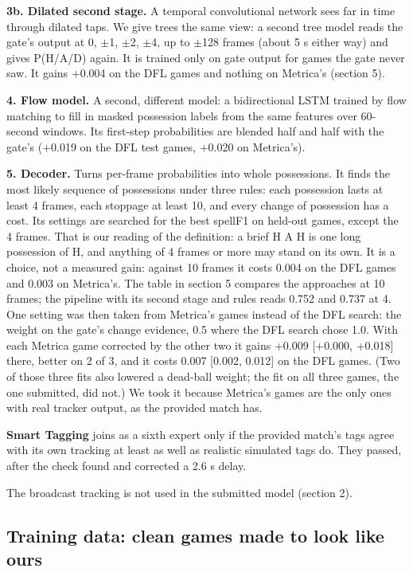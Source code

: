 \documentclass[10pt,a4paper]{article}
\begin{document}
\textbf{3b. Dilated second stage.} A temporal convolutional network sees far in time through dilated
taps. We give trees the same view: a second tree model reads the gate's output at 0, \ensuremath{\pm}1, \ensuremath{\pm}2, \ensuremath{\pm}4,
up to \ensuremath{\pm}128 frames (about 5 s either way) and gives P(H/A/D) again. It is trained only on gate
output for games the gate never saw. It gains +0.004 on the DFL games and nothing on Metrica's
(section 5).


\textbf{4. Flow model.} A second, different model: a bidirectional LSTM trained by flow matching to
fill in masked possession labels from the same features over 60-second windows. Its first-step
probabilities are blended half and half with the gate's (+0.019 on the DFL test games, +0.020 on
Metrica's).


\textbf{5. Decoder.} Turns per-frame probabilities into whole possessions. It finds the most likely
sequence of possessions under three rules: each possession lasts at least 4 frames, each
stoppage at least 10, and every change of possession has a cost. Its settings are searched for the
best spellF1 on held-out games, except the 4 frames. That is our reading of the definition: a
brief H A H is one long possession of H, and anything of 4 frames or more may stand on its own.
It is a choice, not a measured gain: against 10 frames it costs 0.004 on the DFL games and 0.003
on Metrica's. The table in section 5 compares the approaches at 10 frames; the pipeline with
its second stage and rules reads 0.752 and 0.737 at 4. One setting was then taken from Metrica's
games instead of the DFL search: the weight on the gate's change evidence, 0.5 where the DFL
search chose 1.0. With each Metrica game corrected by the other two it gains +0.009 [+0.000,
+0.018] there, better on 2 of 3, and it costs 0.007 [0.002, 0.012] on the DFL games. (Two of those three
fits also lowered a dead-ball weight; the fit on all three games, the one submitted, did not.) We took it
because Metrica's games are the only ones with real tracker output, as the provided match has.


\textbf{Smart Tagging} joins as a sixth expert only if the provided match's tags agree with its own
tracking at least as well as realistic simulated tags do. They passed, after the check found and
corrected a 2.6 s delay.


The broadcast tracking is not used in the submitted model (section 2).


\subsection*{Training data: clean games made to look like ours}
\end{document}
